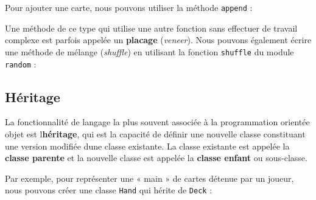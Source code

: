 Pour ajouter une carte, nous pouvons utiliser la méthode \texttt{append}
:

\begin{Shaded}
\begin{Highlighting}[]


\end{Highlighting}
\end{Shaded}

Une méthode de ce type qui utilise une autre fonction sans effectuer de
travail complexe est parfois appelée un \textbf{placage}
(\emph{veneer}). Nous pouvons également écrire une méthode de mélange
(\emph{shuffle}) en utilisant la fonction \texttt{shuffle} du module
\texttt{random} :

\begin{Shaded}
\begin{Highlighting}[]


\NormalTok{):}
\end{Highlighting}
\end{Shaded}

\hypertarget{huxe9ritage-1}{%
\subsection{Héritage}\label{huxe9ritage-1}}

La fonctionnalité de langage la plus souvent associée à la programmation
orientée objet est l\textquotesingle{}\textbf{héritage}, qui est la
capacité de définir une nouvelle classe constituant une version modifiée
d\textquotesingle une classe existante. La classe existante est appelée
la \textbf{classe parente} et la nouvelle classe est appelée la
\textbf{classe enfant} ou sous-classe.

Par exemple, pour représenter une « main » de cartes détenue par un
joueur, nous pouvons créer une classe \texttt{Hand} qui hérite de
\texttt{Deck} :

\begin{Shaded}
\begin{Highlighting}[]
\end{Highlighting}
\end{Shaded}

